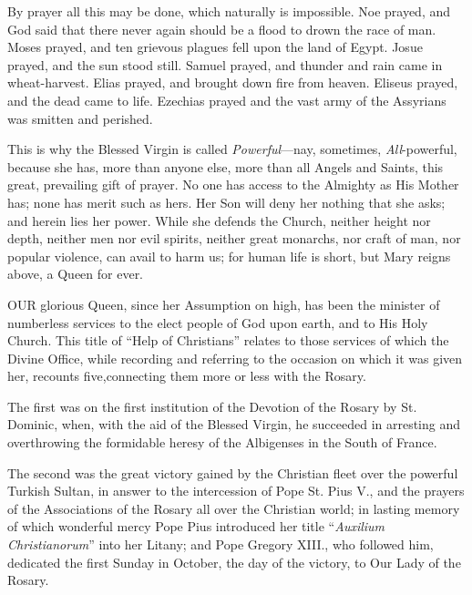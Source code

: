 By prayer all this may be done,
which naturally is impossible. Noe prayed, and God said that there never again should be a flood to drown the race of man. Moses prayed,
and ten grievous plagues fell upon the land of Egypt. Josue prayed, and
the sun stood still. Samuel prayed, and thunder and rain came in
wheat-harvest. Elias prayed, and brought down fire from heaven. Eliseus
prayed, and the dead came to life. Ezechias prayed and the vast army of
the Assyrians was smitten and perished.

This is why the Blessed Virgin
is called \emph{Powerful}—nay, sometimes, \emph{All}-powerful, because
she has, more than anyone else, more than all Angels and Saints, this
great, prevailing gift of prayer. No one has access to the Almighty as
His Mother has; none has merit such as hers. Her Son will deny her
nothing that she asks; and herein lies her power. While she defends the
Church, neither height nor depth, neither men nor evil spirits, neither
great monarchs, nor craft of man, nor popular violence, can avail to
harm us; for human life is short, but Mary reigns above, a Queen for
ever.



OUR
glorious Queen, since her Assumption on high, has been the minister of
numberless services to the elect people of God upon earth, and to His
Holy Church. This title of ``Help of Christians'' relates to those
services of which the Divine Office, while recording and referring to
the occasion on which it was given her, recounts five,\emph{}connecting
them more or less with the Rosary.

The first was on the first
institution of the Devotion of the Rosary by St. Dominic, when, with the
aid of the Blessed Virgin, he succeeded in arresting and overthrowing
the formidable heresy of the Albigenses in the South of France.

The second was the great victory
gained by the Christian fleet over the powerful Turkish Sultan, in
answer to the intercession of Pope St. Pius V., and the prayers of the
Associations of the Rosary all over the Christian world; in lasting
memory of which wonderful mercy Pope Pius introduced her title ``\emph{Auxilium
Christianorum}'' into her Litany; and Pope Gregory XIII., who followed
him, dedicated the first Sunday in October, the day of the victory, to
Our Lady of the Rosary.

